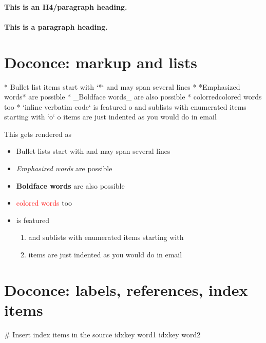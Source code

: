 \documentclass[%
oneside,                 %
final,                   %
chapterprefix=true,      %
open=right               %
10pt]{book}
\begin{document}
\paragraph{This is an H4/paragraph heading.}
\paragraph{This is a paragraph heading.}
\section{Doconce: markup and lists}

\bccq
 * Bullet list items start with `*`
   and may span several lines
 * *Emphasized words* are possible
 * _Boldface words_ are also possible
 * color{red}{colored words} too
 * `inline verbatim code` is featured
   o and sublists with enumerated items starting with `o`
   o items are just indented as you would do in email
\eccq

This gets rendered as

\begin{itemize}
 \item Bullet lists start with \code{*}
   and may span several lines

 \item \emph{Emphasized words} are possible

 \item \textbf{Boldface words} are also possible

 \item \textcolor{red}{colored words} too

 \item {} is featured
\begin{enumerate}

  \item and sublists with enumerated items starting with 

  \item items are just indented as you would do in email
\end{enumerate}

\noindent
\end{itemize}

\noindent
\section{Doconce: labels, references, index items}

\bccq
# Insert index items in the source
idx{key word1} idx{key word2}
\end{document}
